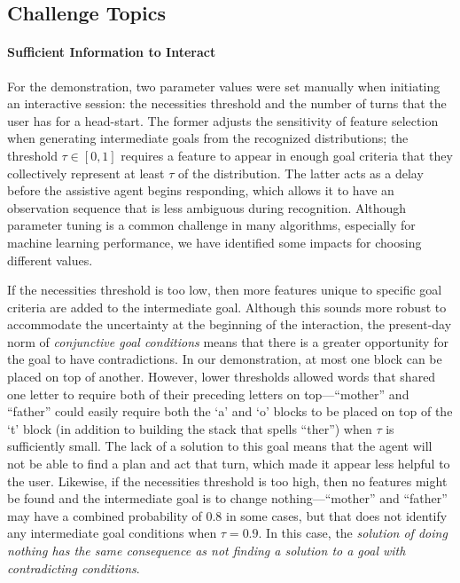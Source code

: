 \documentclass[letterpaper]{article} %
\begin{document}
\subsection{Challenge Topics\label{sec:challenges.topics}}
\paragraph{Sufficient Information to Interact} For the demonstration, two parameter values were set manually when initiating an interactive session: the necessities threshold and the number of turns that the user has for a head-start.  The former adjusts the sensitivity of feature selection when generating intermediate goals from the recognized distributions; the threshold $\tau \in [0, 1]$ requires a feature to appear in enough goal criteria that they collectively represent at least $\tau$ of the distribution.  The latter acts as a delay before the assistive agent begins responding, %
which allows it to have an observation sequence that is less ambiguous during recognition.  Although parameter tuning is a common challenge in many algorithms, especially for machine learning performance, we have identified some impacts for choosing different values.

If the necessities threshold is too low, then more features unique to specific goal criteria are added to the intermediate goal.  Although this sounds more robust to accommodate the uncertainty at the beginning of the interaction, the present-day norm of \textit{conjunctive goal conditions} means that there is a greater opportunity for the goal to have contradictions.  In our demonstration, at most one block can be placed on top of another.  However, lower thresholds allowed words that shared one letter to require both of their preceding letters on top---``mother'' and ``father'' could easily require both the `a' and `o' blocks to be placed on top of the `t' block (in addition to building the stack that spells ``ther'') when $\tau$ is sufficiently small.
The lack of a solution to this goal means that the agent will not be able to find a plan and act that turn, which made it appear less helpful to the user.  Likewise, if the necessities threshold is too high, then no features might be found and the intermediate goal is to change nothing---``mother'' and ``father'' may have a combined probability of $0.8$ in some cases, but that does not identify any intermediate goal conditions when $\tau = 0.9$.
In this case, the \textit{solution of doing nothing has the same consequence as not finding a solution to a goal with contradicting conditions}.
\end{document}
